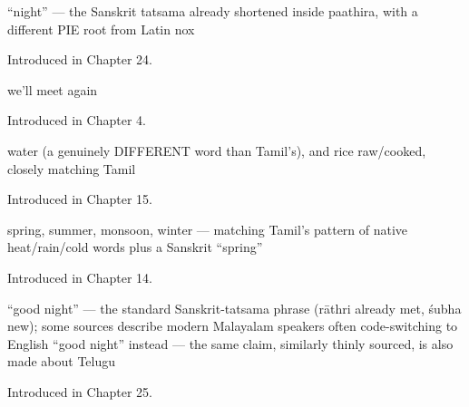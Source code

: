 \noindent\begin{minipage}[t]{\linewidth}
\raggedright
\textbf{}\par
\small \textquotedblleft{}night\textquotedblright{} — the Sanskrit tatsama already shortened inside paathira, with a different PIE root from Latin nox\par
\footnotesize Introduced in Chapter 24.
\end{minipage}\par\medskip

\noindent\begin{minipage}[t]{\linewidth}
\raggedright
\textbf{ }\par
\small we'll meet again\par
\footnotesize Introduced in Chapter 4.
\end{minipage}\par\medskip

\noindent\begin{minipage}[t]{\linewidth}
\raggedright
\textbf{  }\par
\small water (a genuinely DIFFERENT word than Tamil's), and rice raw/cooked, closely matching Tamil\par
\footnotesize Introduced in Chapter 15.
\end{minipage}\par\medskip

\noindent\begin{minipage}[t]{\linewidth}
\raggedright
\textbf{   }\par
\small spring, summer, monsoon, winter — matching Tamil's pattern of native heat/rain/cold words plus a Sanskrit \textquotedblleft{}spring\textquotedblright{}\par
\footnotesize Introduced in Chapter 14.
\end{minipage}\par\medskip

\noindent\begin{minipage}[t]{\linewidth}
\raggedright
\textbf{ }\par
\small \textquotedblleft{}good night\textquotedblright{} — the standard Sanskrit-tatsama phrase (rāthri already met, śubha new); some sources describe modern Malayalam speakers often code-switching to English \textquotedblleft{}good night\textquotedblright{} instead — the same claim, similarly thinly sourced, is also made about Telugu\par
\footnotesize Introduced in Chapter 25.
\end{minipage}\par\medskip

